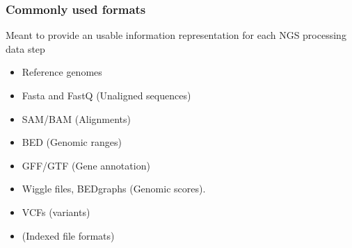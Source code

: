 \documentclass{beamer}
\begin{document}
\begin{frame}
  \frametitle{Commonly used formats}

Meant to provide an usable information representation for each NGS processing data step

  \begin{itemize}

  \item  Reference genomes

  \item  Fasta and FastQ (Unaligned sequences)
 
  \item SAM/BAM (Alignments)
 
  \item BED (Genomic ranges)
 
  \item GFF/GTF (Gene annotation)
 
  \item Wiggle files, BEDgraphs (Genomic scores).
 

  \item VCFs (variants)

  \item (Indexed file formats)


  \end{itemize}
\end{frame}










\end{document}
